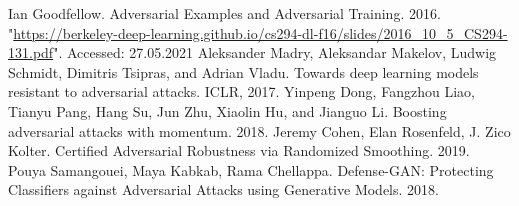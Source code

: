 \documentclass{article}
\begin{document}
\begin{thebibliography}{00}
     Ian Goodfellow. Adversarial Examples and Adversarial Training. 2016. "\url{https://berkeley-deep-learning.github.io/cs294-dl-f16/slides/2016_10_5_CS294-131.pdf}". Accessed: 27.05.2021
     Aleksander Madry, Aleksandar Makelov, Ludwig Schmidt, Dimitris Tsipras, and Adrian Vladu. Towards deep learning models resistant to adversarial attacks. ICLR, 2017.
     Yinpeng Dong, Fangzhou Liao, Tianyu Pang, Hang Su, Jun Zhu, Xiaolin Hu, and Jianguo Li. Boosting adversarial attacks with momentum. 2018.
     Jeremy Cohen, Elan Rosenfeld, J. Zico Kolter. Certified Adversarial Robustness via Randomized Smoothing. 2019.
     Pouya Samangouei, Maya Kabkab, Rama Chellappa. Defense-GAN: Protecting Classifiers against Adversarial Attacks using Generative Models. 2018.
  
  \end{thebibliography}
\end{document}
